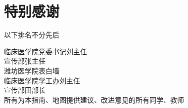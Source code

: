 \chapter*{特别感谢}
 {\centering 以下排名不分先后\\}
\noindent\begin{table*}[!htbp]
    \centering

    {\large 临床医学院党委书记刘主任\\
        宣传部张主任\\
        潍坊医学院表白墙\\
        临床医学院学工办刘主任\\
        宣传部田部长\\
        所有为本指南、地图提供建议、改进意见的所有同学、教师}
\end{table*}